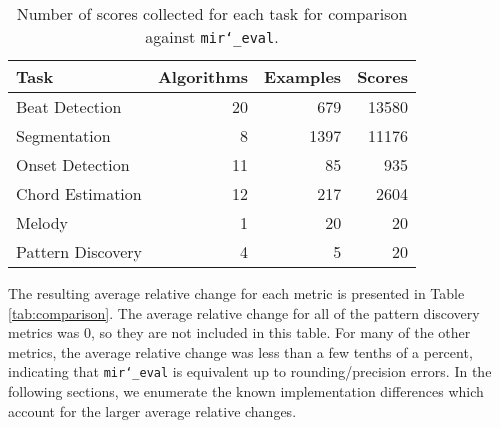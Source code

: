 \documentclass{article}
\def\mireval{\texttt{mir\char`_eval}}
\begin{document}
\begin{table}[htb]
  \centering
\begin{tabularx}{\columnwidth}{l r r r}
\toprule
Task & Algorithms & Examples & Scores\\
\midrule
Beat Detection & 20 & 679 & 13580\\
Segmentation & 8 & 1397 & 11176 \\
Onset Detection & 11 & 85 & 935 \\
Chord Estimation & 12 & 217 & 2604 \\
Melody & 1 & 20 & 20 \\
Pattern Discovery & 4 & 5 & 20 \\
\bottomrule
\end{tabularx}
 \caption{Number of scores collected for each task for comparison against \mireval{}.}
 \label{tab:nexamples}
\end{table}

The resulting average relative change for each metric is presented in Table \ref{tab:comparison}.
The average relative change for all of the pattern discovery metrics was 0, so they are not included in this table.
For many of the other metrics, the average relative change was less than a few tenths of a percent, indicating that \mireval{} is equivalent up to rounding/precision errors.
In the following sections, we enumerate the known implementation differences which account for the larger average relative changes.
\end{document}
